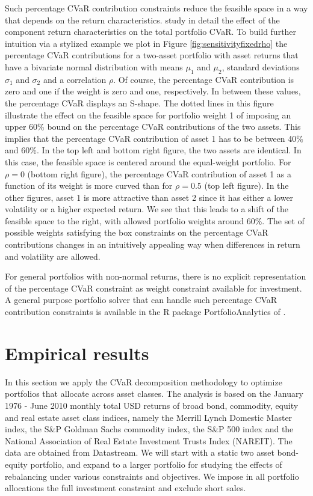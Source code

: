 \documentclass[12pt,a4paper]{article}
\begin{document}
Such percentage CVaR contribution constraints reduce the feasible space in a way that depends on the return characteristics. \citet{Stoyanov2009} study in detail the effect of the component return characteristics on the total portfolio CVaR. To build further intuition via a stylized example we plot in Figure \ref{fig:sensitivityfixedrho} the percentage CVaR contributions for a two-asset portfolio with asset returns that have a bivariate normal distribution with means $\mu_1$  and $\mu_2$, standard deviations $\sigma_1$ and $\sigma_2$  and a correlation $\rho$. Of course, the percentage CVaR contribution is zero and one if the weight is zero and one, respectively. In between these values, the percentage CVaR displays an S-shape. The dotted lines in this figure illustrate the effect on the feasible space for portfolio weight 1 of imposing an upper 60\% bound on the percentage CVaR contributions of the two assets. This implies that the percentage CVaR contribution of asset 1 has to be between 40\% and 60\%. In the top left and bottom right figure, the two assets are identical. In this case, the feasible space is centered around the equal-weight portfolio. For $\rho=0$ (bottom right figure), the percentage CVaR contribution of asset 1 as a function of its weight is more curved than for $\rho=0.5$ (top left figure). In the other figures, asset 1 is more attractive than asset 2 since it has either a lower volatility or a higher expected return. We see that this leads to a shift of the feasible space to the right, with allowed portfolio weights around 60\%. The set of possible weights satisfying the box constraints on the percentage CVaR contributions changes in an intuitively appealing way when differences in return and volatility are allowed.

For general portfolios with non-normal returns, there is no explicit representation of the percentage CVaR constraint as weight constraint available for investment. A general purpose portfolio solver that can handle such percentage CVaR contribution constraints is available in the R package PortfolioAnalytics of \citet{PortfolioAnalytics}.

\section{Empirical results \label{sec:empiricalresults}}


In this section we apply the CVaR decomposition methodology to optimize portfolios that allocate across asset classes. The analysis is based on the January 1976 - June 2010 monthly total USD returns of broad bond, commodity, equity and real estate asset class indices, namely the Merrill Lynch Domestic Master index,  the S\&P Goldman Sachs commodity index, the S\&P 500 index and the National Association of Real Estate Investment Trusts Index (NAREIT). The data are obtained from Datastream.  We will start with a static two asset bond-equity portfolio, and expand to a larger portfolio for studying the effects of rebalancing under various constraints and objectives. We impose in all portfolio allocations the full investment constraint and exclude short sales.
\end{document}
